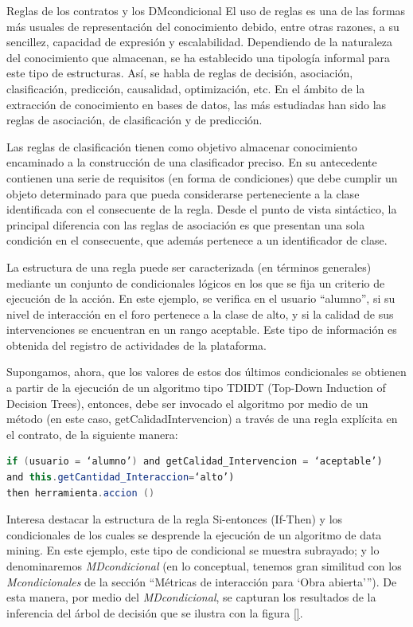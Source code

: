 \begin{itemize}
Reglas de los contratos y los DMcondicional El uso de reglas es una de las
formas más usuales de representación del conocimiento debido, entre otras
razones, a su sencillez, capacidad de expresión y escalabilidad. Dependiendo de
la naturaleza del conocimiento que almacenan, se ha establecido una tipología
informal para este tipo de estructuras. Así, se habla de reglas de decisión,
asociación, clasificación, predicción, causalidad, optimización, etc. En el
ámbito de la extracción de conocimiento en bases de datos, las más estudiadas
han sido las reglas de asociación, de clasificación y de predicción.


Las reglas de clasificación tienen como objetivo almacenar
conocimiento encaminado a la construcción de una clasificador preciso. En su
antecedente contienen una serie de requisitos (en forma de condiciones) que debe
cumplir un objeto determinado para que pueda considerarse perteneciente a la
clase identificada con el consecuente de la regla. Desde el punto de
vista sintáctico, la principal diferencia con las reglas de asociación es que 
presentan una sola condición en el consecuente, que además pertenece a un
identificador de clase.


La estructura de una regla puede ser caracterizada (en términos
generales) mediante un conjunto de condicionales lógicos en los que se fija un
criterio de ejecución de la acción. En este ejemplo, se verifica en el usuario
“alumno”, si su nivel de interacción en el foro pertenece a la clase de alto, y
si la calidad de sus intervenciones se encuentran en un rango aceptable. Este
tipo de información es obtenida del registro de actividades de la plataforma.


Supongamos, ahora, que los valores de estos dos últimos condicionales se
obtienen a partir de la ejecución de un algoritmo tipo TDIDT (Top-Down Induction
of Decision Trees), entonces, debe ser invocado el algoritmo por medio de un
método (en este caso, getCalidadIntervencion) a través de una regla explícita
en el contrato, de la siguiente manera:

\begin{lstlisting}[language=Java]
if (usuario = ‘alumno’) and getCalidad_Intervencion = ‘aceptable’)
and this.getCantidad_Interaccion=‘alto’)
then herramienta.accion ()
\end{lstlisting} 

Interesa destacar la estructura de la regla Si-entonces (If-Then) y los condicionales
de los cuales se desprende la ejecución de un algoritmo de data mining.
En este ejemplo, este tipo de condicional se muestra subrayado; y lo denominaremos
\textit{MDcondicional} (en lo conceptual, tenemos gran similitud con los
\textit{Mcondicionales} de la sección “Métricas de interacción para ‘Obra
abierta’”). De esta manera, por medio del \textit{MDcondicional}, se capturan
los resultados de la inferencia del árbol de decisión que se ilustra con la
figura \ref{}.


\end{itemize}
